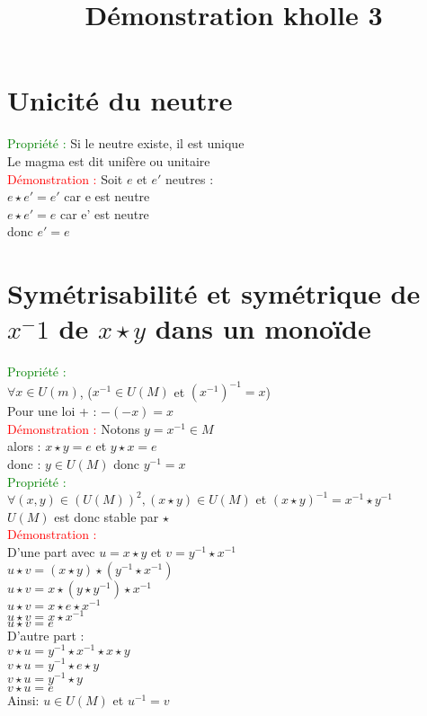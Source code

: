 \documentclass{article}
\begin{document}
\title{Démonstration kholle 3}
\date{}
\maketitle
	\renewcommand{\thesection}{\Roman{section}}
	\setlength{\parindent}{1.5cm}
	\section{Unicité du neutre}
	\textcolor{green}{Propriété :} Si le neutre existe, il est unique \\
	\indent Le magma est dit unif\`ere ou unitaire \\
	\textcolor{red}{Démonstration :} Soit $e$ et $e'$ neutres : \\
	$e \star e' = e'$ car e est neutre \\
	$e \star e' = e$ car e' est neutre \\
	donc $e'=e$
	\section{Symétrisabilité et symétrique de $x^-1$ de $x \star y$ dans un monoïde}
	\textcolor{green}{Propriété :} \\
	 \indent $\forall x \in U(m)$, ($x^{-1} \in U(M)$ et $(x^{-1})^{-1}=x$) \\
	Pour une loi + : $-(-x)=x$ \\
	\textcolor{red}{Démonstration :} Notons $y =x^{-1} \in M$ \\
	\indent alors : $ x \star y = e$ et $ y \star x = e $ \\
	\indent donc : $y \in U(M)$ donc $y^{-1}=x$ \\
	\textcolor{green}{Propriété :} \\ $\forall (x,y) \in (U(M))^2, ( x \star y) \in U(M)$ et $(x \star y)^{-1} = x^{-1} \star y^{-1}$ \\
	$U(M)$ est donc stable par $\star$ \\
	\textcolor{red}{Démonstration :} \\ D'une part avec $u= x \star y$ et $v=y^{-1}\star x^{-1}$ \\
\indent $u \star v = (x \star y) \star (y^{-1} \star x^{-1})$\\
\indent $u \star v= x \star (y \star y^{-1}) \star x^{-1}$ \\
\indent $u \star v= x \star e \star x^{-1}$ \\
\indent $u \star v= x \star x^{-1}$ \\
\indent $u \star v= e$ \\
D'autre part : \\
 \indent
$v \star u = y^{-1} \star x^{-1} \star x \star y$ \\
\indent $v \star u =y^{-1} \star e \star y$ \\
\indent $v \star u = y^{-1} \star y$ \\
\indent $v \star u = e$
 \\
	Ainsi: $ u \in U(M)$ et $u^{-1}=v$
\end{document}
